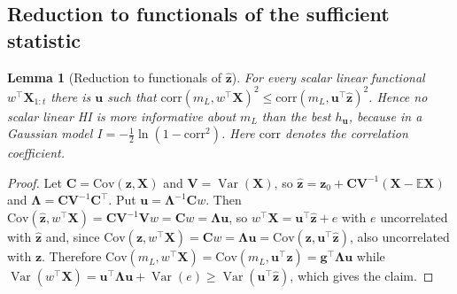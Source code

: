 \documentclass[preprint,12pt]{elsarticle}
\newtheorem{lemma}{Lemma}
\theoremstyle{definition}
\newcommand{\E}{\mathbb{E}}
\DeclareMathOperator{\Var}{Var}
\begin{document}
\subsection{Reduction to functionals of the sufficient statistic}
\begin{lemma}[Reduction to functionals of $\hat{\mathbf z}$]
\label{lem:reduce}
For every scalar linear functional $w^\top\mathbf{X}_{1:t}$ there is $\mathbf u$ such that $\mathrm{corr}(m_L,w^\top\mathbf{X})^2\le\mathrm{corr}(m_L,\mathbf u^\top\hat{\mathbf z})^2$. Hence no scalar linear HI is more informative about $m_L$ than the best $h_{\mathbf u}$, because in a Gaussian model $I=-\tfrac12\ln(1-\mathrm{corr}^2)$. Here $\mathrm{corr}$ denotes the correlation coefficient.
\end{lemma}
\begin{proof}
Let $\mathbf C=\mathrm{Cov}(\mathbf z,\mathbf{X})$ and $\mathbf V=\Var(\mathbf{X})$, so $\hat{\mathbf z}=\mathbf z_0+\mathbf C\mathbf V^{-1}(\mathbf{X}-\E\mathbf{X})$ and $\boldsymbol\Lambda=\mathbf C\mathbf V^{-1}\mathbf C^\top$. Put $\mathbf u=\boldsymbol\Lambda^{-1}\mathbf Cw$. Then $\mathrm{Cov}(\hat{\mathbf z},w^\top\mathbf{X})=\mathbf C\mathbf V^{-1}\mathbf Vw=\mathbf Cw=\boldsymbol\Lambda\mathbf u$, so $w^\top\mathbf{X}=\mathbf u^\top\hat{\mathbf z}+e$ with $e$ uncorrelated with $\hat{\mathbf z}$ and, since $\mathrm{Cov}(\mathbf z,w^\top\mathbf{X})=\mathbf Cw=\boldsymbol\Lambda\mathbf u=\mathrm{Cov}(\mathbf z,\mathbf u^\top\hat{\mathbf z})$, also uncorrelated with $\mathbf z$. Therefore $\mathrm{Cov}(m_L,w^\top\mathbf{X})=\mathrm{Cov}(m_L,\mathbf u^\top\hat{\mathbf z})=\mathbf g^\top\boldsymbol\Lambda\mathbf u$ while $\Var(w^\top\mathbf{X})=\mathbf u^\top\boldsymbol\Lambda\mathbf u+\Var(e)\ge\Var(\mathbf u^\top\hat{\mathbf z})$, which gives the claim.
\end{proof}
\end{document}
